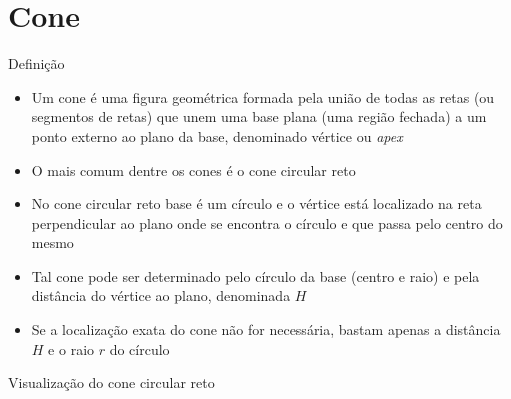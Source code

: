 \section{Cone}

\begin{frame}[fragile]{Definição}

    \begin{itemize}
        \item Um cone é uma figura geométrica formada pela união de todas as retas 
            (ou segmentos de retas) que unem uma base plana (uma região fechada) a um 
            ponto externo ao plano da base, denominado vértice ou \textit{apex}
        \pause

        \item O mais comum dentre os cones é o cone circular reto
        \pause

        \item No cone circular reto base é um círculo e o vértice está localizado na reta 
            perpendicular ao plano onde se encontra o círculo e que passa pelo centro do mesmo
        \pause

        \item Tal cone pode ser determinado pelo círculo da base (centro e raio) e pela distância 
            do vértice ao plano, denominada $H$
        \pause

        \item Se a localização exata do cone não for necessária, bastam apenas a distância $H$ e o 
            raio $r$ do círculo


    \end{itemize}

\end{frame}

\begin{frame}[fragile]{Visualização do cone circular reto}

    \begin{figure}
        \centering
    \end{figure}

\end{frame}

